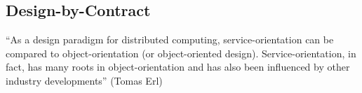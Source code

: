 \subsection{Design-by-Contract}

``As a design paradigm for distributed computing, service-orientation can be
compared to object-orientation (or object-oriented design). Service-orientation, in fact, has many roots in object-orientation and has also been influenced by other industry developments''
(Tomas Erl)

%


\clearpage
